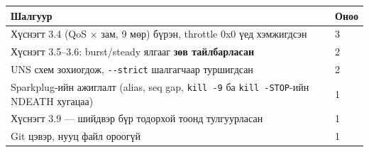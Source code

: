 \begingroup\scriptsize\begin{longtable}[]{@{}ll@{}}
\toprule
\begin{minipage}[b]{0.47\columnwidth}\raggedright
Шалгуур\strut
\end{minipage} & \begin{minipage}[b]{0.47\columnwidth}\raggedright
Оноо\strut
\end{minipage}\tabularnewline
\midrule
\endhead
\begin{minipage}[t]{0.47\columnwidth}\raggedright
Хүснэгт 3.4 (QoS × зам, 9 мөр) бүрэн, throttle 0x0 үед хэмжигдсэн\strut
\end{minipage} & \begin{minipage}[t]{0.47\columnwidth}\raggedright
3\strut
\end{minipage}\tabularnewline
\begin{minipage}[t]{0.47\columnwidth}\raggedright
Хүснэгт 3.5--3.6: burst/steady ялгааг \textbf{зөв тайлбарласан}\strut
\end{minipage} & \begin{minipage}[t]{0.47\columnwidth}\raggedright
2\strut
\end{minipage}\tabularnewline
\begin{minipage}[t]{0.47\columnwidth}\raggedright
UNS схем зохиогдож, \texttt{-\/-strict} шалгагчаар туршигдсан\strut
\end{minipage} & \begin{minipage}[t]{0.47\columnwidth}\raggedright
2\strut
\end{minipage}\tabularnewline
\begin{minipage}[t]{0.47\columnwidth}\raggedright
Sparkplug-ийн ажиглалт (alias, seq gap, \texttt{kill\ -9} ба \texttt{kill\ -STOP}-ийн NDEATH хугацаа)\strut
\end{minipage} & \begin{minipage}[t]{0.47\columnwidth}\raggedright
1\strut
\end{minipage}\tabularnewline
\begin{minipage}[t]{0.47\columnwidth}\raggedright
Хүснэгт 3.9 --- шийдвэр бүр тодорхой тоонд тулгуурласан\strut
\end{minipage} & \begin{minipage}[t]{0.47\columnwidth}\raggedright
1\strut
\end{minipage}\tabularnewline
\begin{minipage}[t]{0.47\columnwidth}\raggedright
Git цэвэр, нууц файл ороогүй\strut
\end{minipage} & \begin{minipage}[t]{0.47\columnwidth}\raggedright
1\strut
\end{minipage}\tabularnewline
\bottomrule
\end{longtable}\endgroup

